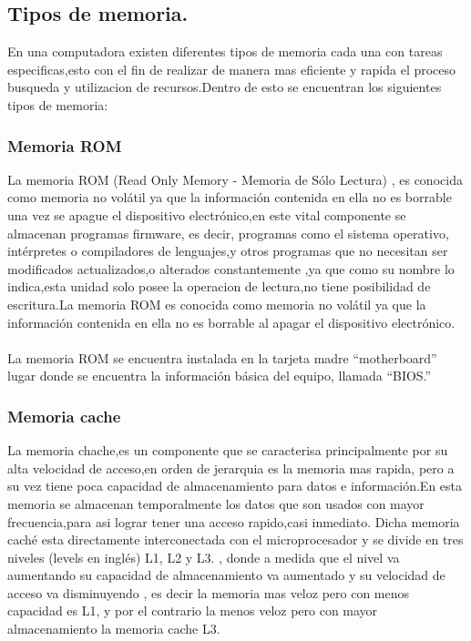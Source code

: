 \documentclass{article}
\begin{document}
\subsection{Tipos de memoria.} \label{contenido}%

En una computadora existen diferentes tipos de memoria cada una con tareas especificas,esto con el fin de realizar de manera mas eficiente y rapida el proceso busqueda y utilizacion de recursos.Dentro de esto se encuentran los siguientes tipos de memoria:

\subsubsection{Memoria ROM}
La memoria ROM (Read Only Memory - Memoria de Sólo Lectura) \cite{augusto}, es conocida como memoria no volátil ya que la información contenida en ella
no es borrable una vez se apague el dispositivo electrónico,en este vital componente se almacenan programas firmware, es decir, programas como el
sistema operativo, intérpretes o compiladores de lenguajes,y otros programas que no necesitan ser modificados actualizados,o alterados constantemente \cite{memorias},ya que como su nombre lo indica,esta unidad  solo posee la operacion de lectura,no tiene posibilidad de escritura.La memoria ROM es conocida como memoria no volátil ya que la información contenida en ella no es borrable al apagar el dispositivo electrónico.\\\\
La memoria ROM se encuentra instalada en la tarjeta madre “motherboard” lugar donde se encuentra la información básica del equipo, llamada “BIOS.”

\subsubsection{Memoria cache}
La memoria chache,es un componente que se caracterisa  principalmente por su alta velocidad de acceso,en orden de jerarquia es la memoria mas rapida, pero a su vez tiene poca capacidad de almacenamiento para datos e información.En esta memoria se almacenan temporalmente los datos que son usados con mayor frecuencia,para asi lograr tener una acceso rapido,casi inmediato\cite{arquitectura}. Dicha memoria caché esta directamente interconectada con el microprocesador y se divide en tres niveles (levels en inglés) L1, L2 y L3. \cite{augusto}, donde a medida que el nivel va aumentando su capacidad de almacenamiento va aumentado y su velocidad de acceso va disminuyendo , es decir la memoria mas veloz pero con menos capacidad es L1, y por el contrario la menos veloz pero con mayor almacenamiento la memoria cache L3.
\end{document}
